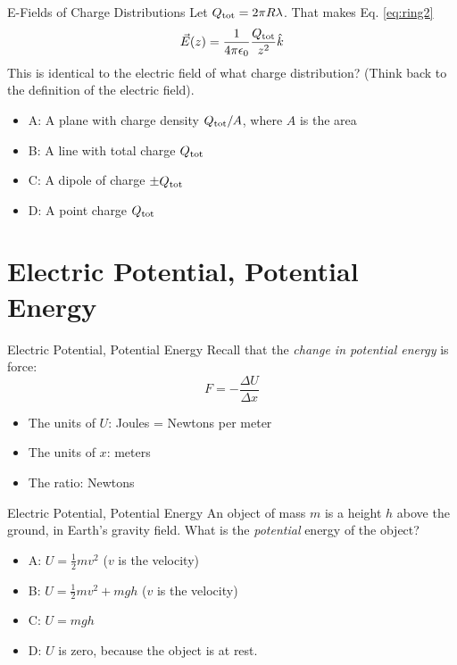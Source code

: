 \documentclass{beamer}
\begin{document}
\begin{frame}{E-Fields of Charge Distributions}
Let $Q_{\rm tot} = 2\pi R \lambda$.  That makes Eq. \ref{eq:ring2}
\begin{equation}
\vec{E}(z) = \frac{1}{4\pi\epsilon_0} \frac{Q_{\rm tot}}{z^2} \hat{k}
\end{equation}
This is identical to the electric field of what charge distribution?  (Think back to the definition of the electric field).
\begin{itemize}
\item A: A plane with charge density $Q_{\rm tot}/A$, where $A$ is the area
\item B: A line with total charge $Q_{\rm tot}$
\item C: A dipole of charge $\pm Q_{\rm tot}$
\item D: A point charge $Q_{\rm tot}$
\end{itemize}
\end{frame}

\section{Electric Potential, Potential Energy}

\begin{frame}{Electric Potential, Potential Energy}
Recall that the \textit{change in potential energy} is force:
\begin{equation}
F = -\frac{\Delta U}{\Delta x}
\end{equation}
\begin{itemize}
\item The units of $U$: Joules = Newtons per meter
\item The units of $x$: meters
\item The ratio: Newtons
\end{itemize}
\end{frame}

\begin{frame}{Electric Potential, Potential Energy}
An object of mass $m$ is a height $h$ above the ground, in Earth's gravity field.  What is the \textit{potential} energy of the object?
\begin{itemize}
\item A: $U = \frac{1}{2}mv^2$ ($v$ is the velocity)
\item B: $U = \frac{1}{2}mv^2 + mgh$ ($v$ is the velocity)
\item C: $U = mgh$
\item D: $U$ is zero, because the object is at rest.
\end{itemize}
\end{frame}
\end{document}
